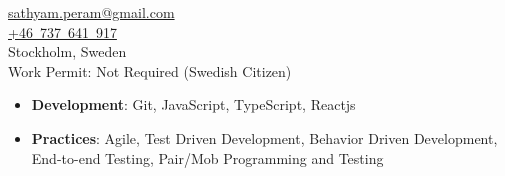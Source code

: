 
\begin{minipage}[t]{0.29\textwidth} %
\colorbox{cvblue!90}{\begin{minipage}[t][5mm][t]{\textwidth}\null\hfill\null\end{minipage}}

\vspace{-0.3ex} %
\colorbox{cvblue!90}
{\color{white}  %
    \textwidth\relax%

    \begin{minipage}[t][293mm][t]{0.82\textwidth}
    \raggedright
    \vspace*{2.5ex}




    \Large
    \vspace*{0.5ex} %
    \href{mailto:sathyam.peram@gmail.com}{sathyam.peram@gmail.com} \\
    \href{tel:+46737641917}{+46~737~641~917} \\
    Stockholm, Sweden \\
    \vspace{0.5em}
    Work Permit: Not Required (Swedish Citizen)

    \Large
    \Large
    \begin{itemize}
    \setlength{\itemsep}{1.5em}
        \item \textbf{Development}: Git, JavaScript, TypeScript, Reactjs
        \item \textbf{Practices}: Agile, Test Driven Development, Behavior Driven Development, End-to-end Testing, Pair/Mob Programming and Testing
    \end{itemize}


\end{minipage}}
\end{minipage}
